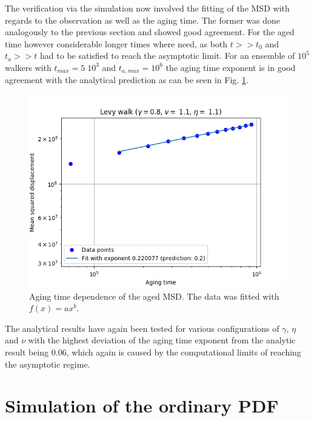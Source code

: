 The verification via the simulation now involved the fitting of the MSD with regards to the observation as well as the aging time. The former was done analogously to the previous section and showed good agreement. For the aged time however considerable longer times where need, as both $t>> t_0$ and $t_a>> t$ had to be satisfied to reach the asymptotic limit. For an ensemble of $10^5$ walkers with $t_{max}=5\; 10^{3}$ and $t_{a,max} = 10^{6}$ the aging time exponent is in good agreement with  the analytical prediction as can be seen in Fig. \ref{fig:plotMSDaged}.
%
\begin{figure}
\begin{center}
\includegraphics[width=120mm]{pics/plotMSDaged}
\caption{Aging time dependence of the aged MSD. The data was fitted with $f(x) = ax^b$.
\label{fig:plotMSDaged} }
\end{center}
\end{figure} 
%
The analytical results have again been tested for various configurations of $\gamma$, $\eta$ and $\nu$ with the highest deviation of the aging time exponent from the analytic result being 0.06, which again is caused by the computational limits of reaching the asymptotic regime.


\section{Simulation of the ordinary PDF} \label{sec:simulatedPDF}

